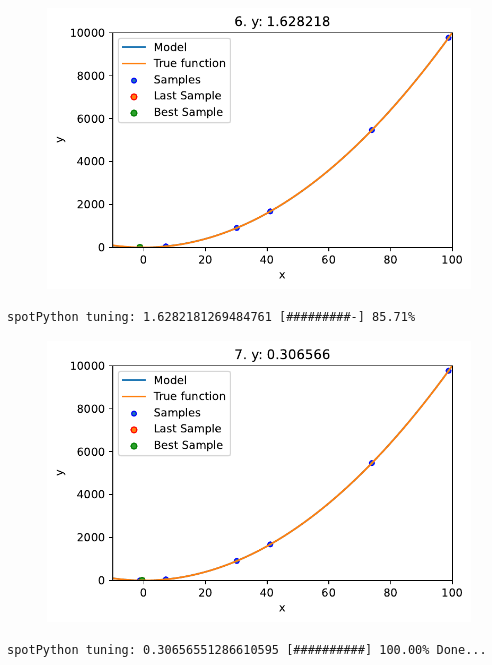 \documentclass[
  letterpaper,
  DIV=11,
  numbers=noendperiod]{scrreprt}
\begin{document}
\begin{figure}[H]

{\centering \includegraphics{99_spot_doc_files/figure-pdf/cell-6-output-2.pdf}

}

\end{figure}

\begin{verbatim}
spotPython tuning: 1.6282181269484761 [#########-] 85.71% 
\end{verbatim}

\begin{figure}[H]

{\centering \includegraphics{99_spot_doc_files/figure-pdf/cell-6-output-4.pdf}

}

\end{figure}

\begin{verbatim}
spotPython tuning: 0.30656551286610595 [##########] 100.00% Done...
\end{verbatim}
\end{document}
